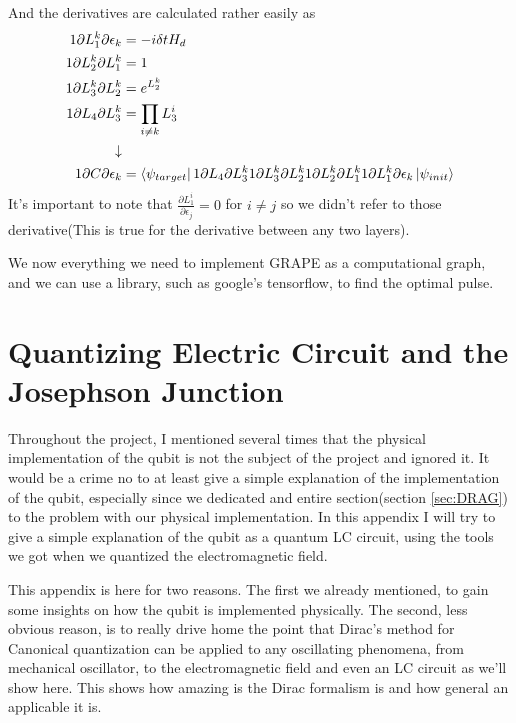 \documentclass[english, a4paper, 12pt, twoside]{article}
\numberwithin{equation}{section} %
\begin{document}
And the derivatives are calculated rather easily as
\begin{align*}
    1{\partial L_1^k}{\partial \epsilon_k} &= -i \delta t H_d\\
    1{\partial L_2^k}{\partial L_1^k} &= 1 \\
    1{\partial L_3^k}{\partial L_2^k} &= e^{L_2^k} \\
    1{\partial L_4}{\partial L_3^k} &= \prod_{i \ne k} L_3^i \\
    \downarrow \\
    1{\partial C}{\partial \epsilon_k} &= \bra{\psi_{target}}  1{\partial L_4}{\partial L_3^k}  1{\partial L_3^k}{\partial L_2^k} 1{\partial L_2^k}{\partial L_1^k}  1{\partial L_1^k}{\partial \epsilon_k} \ket{\psi_{init}}
\end{align*}
It's important to note that $\frac{\partial L_1^i}{\partial \epsilon_j} = 0$ for $i \ne j$ so we didn't refer to those derivative(This is true for the derivative between any two layers).

We now everything we need to implement GRAPE as a computational graph, and we can use a library, such as google's tensorflow, to find the optimal pulse.

\newpage
\section{Quantizing Electric Circuit and the Josephson Junction}
Throughout the project, I mentioned several times that the physical implementation of the qubit is not  the subject of the project and ignored it. It would be a crime no to at least give a simple explanation of the implementation of the qubit, especially since we dedicated and entire section(section \ref{sec:DRAG}) to the problem with our physical implementation. In this appendix I will try to give a simple explanation of  the qubit as a quantum LC circuit, using the  tools we got when we quantized the electromagnetic field.

This appendix is here for two reasons. The first we already mentioned, to gain some insights on how the qubit is implemented physically. The second, less obvious reason, is to really drive home the point that Dirac's method for Canonical quantization can be applied to any oscillating phenomena, from mechanical oscillator, to the electromagnetic field and even an LC circuit as we'll show here. This shows how amazing is the Dirac formalism is and how general an applicable it is.
\end{document}
